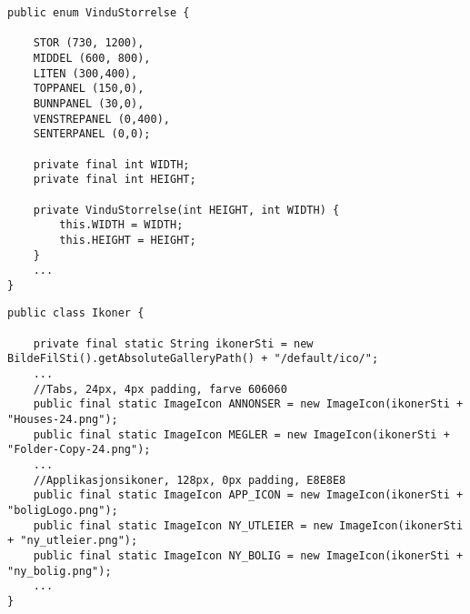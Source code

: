 \begin{lstlisting}[caption=Enum klasse for vindustørrelser, label=kode:guikonst1]
public enum VinduStorrelse {

    STOR (730, 1200),
    MIDDEL (600, 800), 
    LITEN (300,400),
    TOPPANEL (150,0),
    BUNNPANEL (30,0),
    VENSTREPANEL (0,400),
    SENTERPANEL (0,0);
    
    private final int WIDTH;
    private final int HEIGHT;

    private VinduStorrelse(int HEIGHT, int WIDTH) {
        this.WIDTH = WIDTH;
        this.HEIGHT = HEIGHT;
    }
	...
}
\end{lstlisting}


\begin{lstlisting}[caption=Utsnitt fra konstantklasse med static variabler for programikoner., label=kode:guikonst2]
public class Ikoner {

    private final static String ikonerSti = new BildeFilSti().getAbsoluteGalleryPath() + "/default/ico/";
	...
    //Tabs, 24px, 4px padding, farve 606060
    public final static ImageIcon ANNONSER = new ImageIcon(ikonerSti + "Houses-24.png");
    public final static ImageIcon MEGLER = new ImageIcon(ikonerSti + "Folder-Copy-24.png");
	...
    //Applikasjonsikoner, 128px, 0px padding, E8E8E8
    public final static ImageIcon APP_ICON = new ImageIcon(ikonerSti + "boligLogo.png");
    public final static ImageIcon NY_UTLEIER = new ImageIcon(ikonerSti + "ny_utleier.png");
    public final static ImageIcon NY_BOLIG = new ImageIcon(ikonerSti + "ny_bolig.png");
	...
}
\end{lstlisting}





